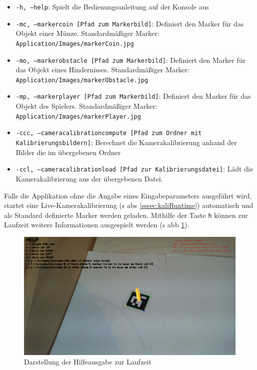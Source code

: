 \begin{itemize}
    \item \texttt{-h, --help}: Spielt die Bedienungsanleitung auf der Konsole aus
    \item \texttt{-mc, --markercoin [Pfad zum Markerbild]}: Definiert den Marker für das Objekt einer Münze. Standardmäßiger Marker: \glqq \texttt{Application/Images/markerCoin.jpg}\grqq
    \item \texttt{-mo, --markerobstacle [Pfad zum Markerbild]}: Definiert den Marker für das Objekt eines Hindernisses. Standardmäßiger Marker: \glqq \texttt{Application/Images/markerObstacle.jpg}\grqq
    \item \texttt{-mp, --markerplayer [Pfad zum Markerbild]}: Definiert den Marker für das Objekt des Spielers. Standardmäßiger Marker: \glqq \texttt{Application/Images/markerPlayer.jpg}\grqq
    \item \texttt{-ccc, --cameracalibrationcompute [Pfad zum Ordner mit Kalibrierungsbildern]}: Berechnet die Kamerakalibrierung anhand der Bilder die im übergebenen Ordner
    \item \texttt{-ccl, --cameracalibrationload [Pfad zur Kalibrierungsdatei]}: Lädt die Kamerakalibrierung aus der übergebenen Datei.
\end{itemize}

\noindent Falls die Applikation ohne die Angabe eines Eingabeparameters ausgeführt wird, startet eine Live-Kamerakalibrierung (\acs{s} \acs{abs} \ref{sssec:kaliRuntime}) automatisch und als Standard definierte Marker werden geladen. Mithilfe der Taste \glqq \texttt{h}\grqq{} können zur Laufzeit weitere Informationen ausgespielt werden (\acs{s} \acs{abb} \ref{fig:HelpShow}).

\begin{figure}[H]
\centering
\includegraphics[width=13cm]{Bilder/BedienungDerApplikation/Hilfe.png}
\caption{Darstellung der Hilfeausgabe zur Laufzeit}
\label{fig:HelpShow}
\end{figure}

